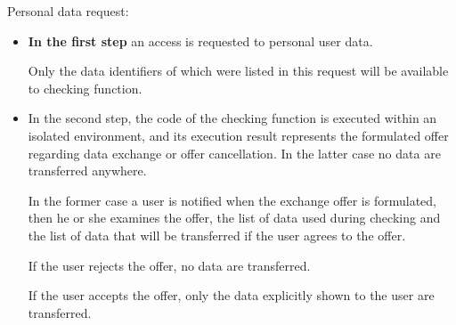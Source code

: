 Personal data request:
\begin{itemize}

\item \textbf{In the first step} an access is requested to personal user data.%

Only the data identifiers of which were listed in this request will be available to checking function.

\item In the second step, the code of the checking function is executed within an isolated environment, and its execution result represents the formulated offer regarding data exchange or offer cancellation. In the latter case no data are transferred anywhere.

In the former case a user is notified when the exchange offer is formulated, then he or she examines the offer, the list of data used during checking and the list of data that will be transferred if the user agrees to the offer.

If the user rejects the offer, no data are transferred.

If the user accepts the offer, only the data explicitly shown to the user are transferred.
\end{itemize}
